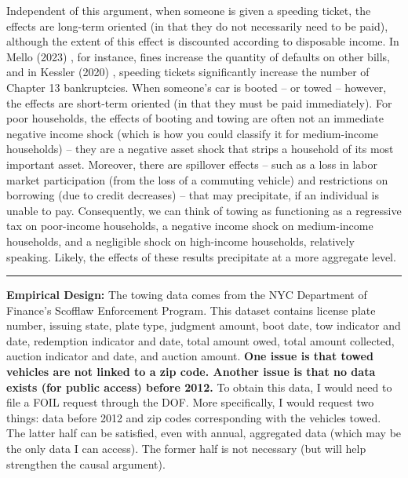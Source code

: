 \documentclass[12pt,letterpaper,doublespace, oneside]{article}
\begin{document}
Independent of this argument, when someone is given a speeding ticket, the effects are long-term oriented (in that they do not necessarily need to be paid), although the extent of this effect is discounted according to disposable income. In Mello (2023) \cite{Mello}, for instance, fines increase the quantity of defaults on other bills, and in Kessler (2020) \cite{Kessler}, speeding tickets significantly increase the number of Chapter 13 bankruptcies. When someone's car is booted -- or towed -- however, the effects are short-term oriented (in that they must be paid immediately). For poor households, the effects of booting and towing are often not an immediate negative income shock (which is how you could classify it for medium-income households) -- they are a negative asset shock that strips a household of its most important asset. Moreover, there are spillover effects -- such as a loss in labor market participation (from the loss of a commuting vehicle) and restrictions on borrowing (due to credit decreases) -- that may precipitate, if an individual is unable to pay. Consequently, we can think of towing as functioning as a regressive tax on poor-income households, a negative income shock on medium-income households, and a negligible shock on high-income households, relatively speaking. Likely, the effects of these results precipitate at a more aggregate level. 



\noindent\rule{\linewidth}{0.4pt}


\noindent\textbf{Empirical Design:} 
The towing data comes from the NYC Department of Finance's Scofflaw Enforcement Program. This dataset contains license plate number, issuing state, plate type, judgment amount, boot date, tow indicator and date, redemption indicator and date, total amount owed, total amount collected, auction indicator and date, and auction amount. \textbf{One issue is that towed vehicles are not linked to a zip code. Another issue is that no data exists (for public access) before 2012.} To obtain this data, I would need to file a FOIL request through the DOF. More specifically, I would request two things: data before 2012 and zip codes corresponding with the vehicles towed. The latter half can be satisfied, even with annual, aggregated data (which may be the only data I can access). The former half is not necessary (but will help strengthen the causal argument).
\end{document}

